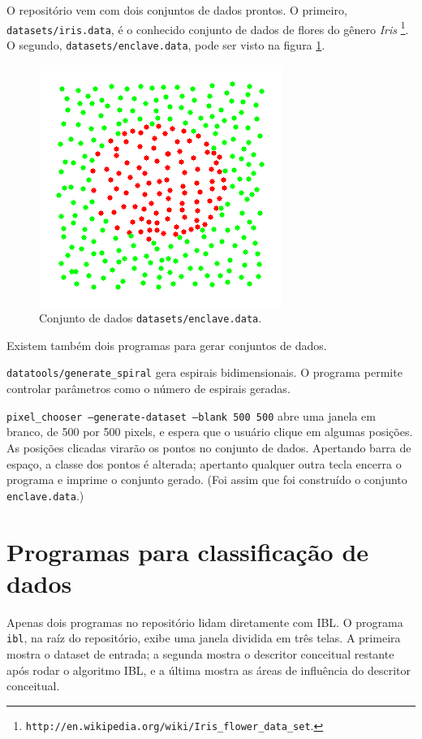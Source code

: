 \documentclass{article}
\begin{document}
O repositório vem com dois conjuntos de dados prontos.
O primeiro, \verb|datasets/iris.data|,
é o conhecido conjunto de dados de flores do gênero \emph{Iris}%
\footnote{
    \texttt{http://en.wikipedia.org/wiki/Iris\_flower\_data\_set}.
}.
O segundo, \verb|datasets/enclave.data|,
pode ser visto na figura \ref{enclave}.

\begin{figure}[h]
    \centering
    \includegraphics[scale=0.5]{enclave.png}
    \caption{Conjunto de dados \texttt{datasets/enclave.data}.}
    \label{enclave}
\end{figure}

Existem também dois programas para gerar conjuntos de dados.

\texttt{datatools/generate\_spiral} gera espirais bidimensionais.
O programa permite controlar parâmetros como o número de espirais geradas.

\texttt{pixel\_chooser --generate-dataset --blank 500 500} abre uma janela em branco,
de 500 por 500 pixels, e espera que o usuário clique em algumas posições.
As posições clicadas virarão os pontos no conjunto de dados.
Apertando barra de espaço, a classe dos pontos é alterada;
apertanto qualquer outra tecla encerra o programa e imprime o conjunto gerado.
(Foi assim que foi construído o conjunto \texttt{enclave.data}.)

\section{Programas para classificação de dados}

Apenas dois programas no repositório lidam diretamente com IBL.
O programa \texttt{ibl}, na raíz do repositório,
exibe uma janela dividida em três telas.
A primeira mostra o dataset de entrada;
a segunda mostra o descritor conceitual restante após rodar o algoritmo IBL,
e a última mostra as áreas de influência do descritor conceitual.
\end{document}
